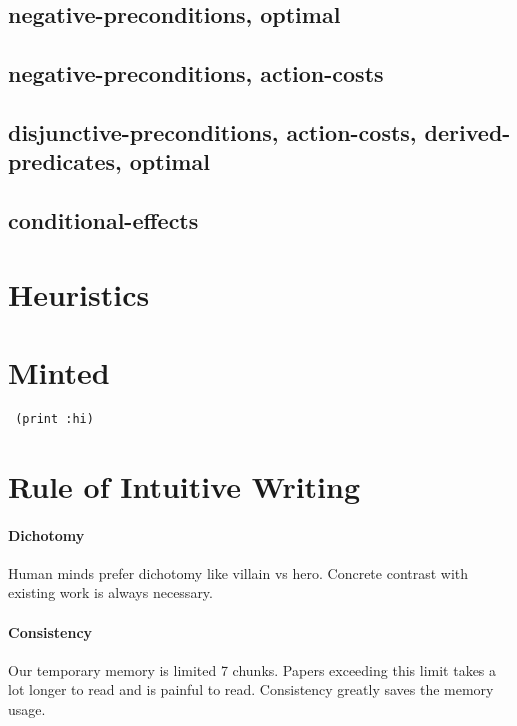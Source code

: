 \subsection{negative-preconditions, optimal}
\subsection{negative-preconditions, action-costs}
\subsection{disjunctive-preconditions, action-costs, derived-predicates, optimal}
\subsection{conditional-effects}


\section{Heuristics}


\section{Minted}

\begin{verbatim}
 (print :hi)
\end{verbatim}

\section{Rule of Intuitive Writing}

\paragraph{Dichotomy}

Human minds prefer dichotomy like villain vs hero.
Concrete contrast with existing work is always necessary.

\paragraph{Consistency}

Our temporary memory is limited 7 chunks.
Papers exceeding this limit takes a lot longer to read and is painful to read.
Consistency greatly saves the memory usage.

